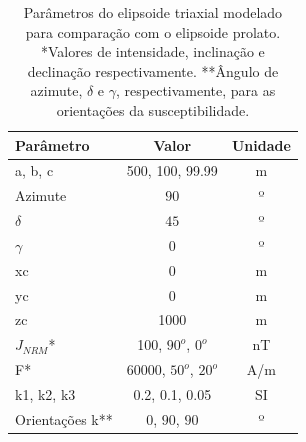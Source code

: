 \begin{table}[h!]
	\begin{center}
		\begin{tabular}{|l|c|c|}
			\hline
			\textbf{Parâmetro}  & \textbf{Valor}  & \textbf{Unidade} \\
			\hline 
			a, b, c  & 500, 100, 99.99 & m\\
			\hline
			Azimute   & $90$ & º\\
			\hline
			$\delta$    & $45$ & º\\
			\hline
			$\gamma$   & $0$  & º\\
			\hline
			xc   & 0 & m \\
			\hline          
			yc   & 0  & m\\
			\hline                
			zc   & 1000  & m\\
			\hline
			$J_{NRM}$*  & 100, $90^o$, $0^o$  & nT\\
			\hline
			F*    & 60000, $50^o$, $20^o$ & A/m\\
			\hline
			k1, k2, k3   & 0.2, 0.1, 0.05  & SI\\
			\hline
			Orientações k**   & $0$, $90$, $90$  & º\\
			\hline
		\end{tabular}
		\caption{Parâmetros do elipsoide triaxial modelado para comparação com o elipsoide prolato. *Valores de intensidade, inclinação e declinação respectivamente. **Ângulo de azimute, $\delta$ e $\gamma$, respectivamente, para as orientações da susceptibilidade.}
	\end{center}
	\label{tab:triaxial_prolate1}
\end{table}

\vspace{2cm}

